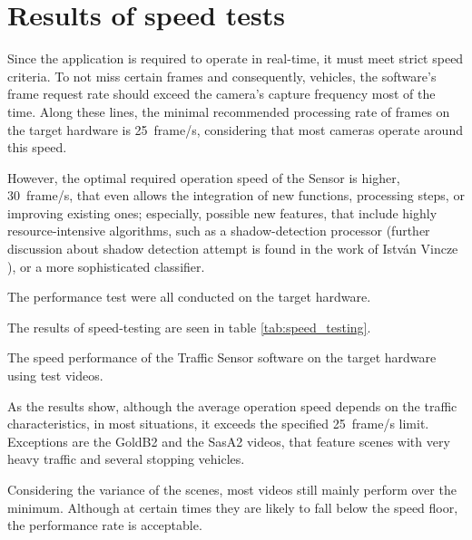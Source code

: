 \section{Results of speed tests}
Since the application is required to operate in real-time, it must meet strict speed criteria.
To not miss certain frames and consequently, vehicles, the software's frame request rate should exceed the camera's capture frequency most of the time.
Along these lines, the minimal recommended processing rate of frames on the target hardware is \SI{25}{frame/s}, considering that most cameras operate around this speed.

However, the optimal required operation speed of the Sensor is higher, \SI{30}{frame/s}, that even allows the integration of new functions, processing steps, or improving existing ones; especially, possible new features, that include highly resource-intensive algorithms, such as a shadow-detection processor (further discussion about shadow detection attempt is found in the work of Istv{\'a}n Vincze \cite{Vincze2016}), or a more sophisticated classifier.

The performance test were all conducted on the target hardware.

The results of speed-testing are seen in table \ref{tab:speed_testing}.

\begin{table}[htbp]
	\centering
	\begin{adjustbox}{center}
	\end{adjustbox}
	\caption{The speed performance of the Traffic Sensor software on the target hardware using test videos.}
	\label{tab:speed_testing}%
\end{table}%

As the results show, although the average operation speed depends on the traffic characteristics, in most situations, it exceeds the specified \SI{25}{frame/s} limit.
Exceptions are the GoldB2 and the SasA2 videos, that feature scenes with very heavy traffic and several stopping vehicles.

Considering the variance of the scenes, most videos still mainly perform over the minimum.
Although at certain times they are likely to fall below the speed floor, the performance rate is acceptable.
